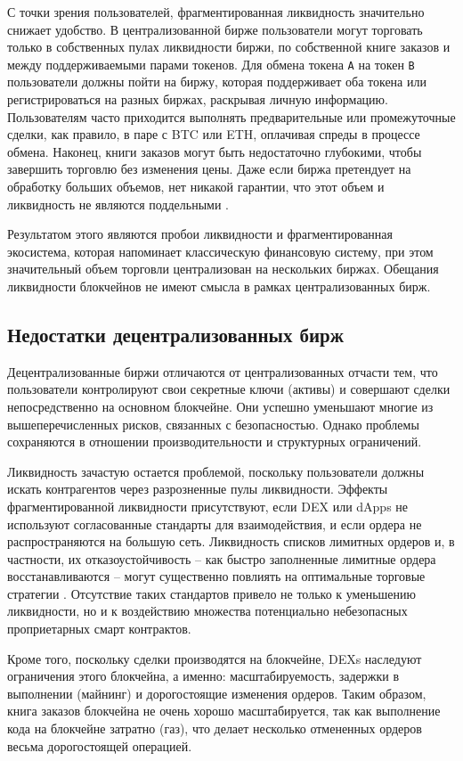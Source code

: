 \documentclass[utf8,nofonts]{article}
\begin{document}
\begin{multicols}{2}
	С точки зрения пользователей, фрагментированная ликвидность значительно снижает удобство. В централизованной бирже пользователи могут торговать только в собственных пулах ликвидности биржи, по собственной книге заказов и между поддерживаемыми парами токенов. Для обмена токена \verb|A| на токен \verb|B| пользователи должны пойти на биржу, которая поддерживает оба токена или регистрироваться на разных биржах, раскрывая личную информацию. Пользователям часто приходится выполнять предварительные или промежуточные сделки, как правило, в паре с BTC или ETH, оплачивая спреды в процессе обмена. Наконец, книги заказов могут быть недостаточно глубокими, чтобы завершить торговлю без изменения цены. Даже если биржа претендует на обработку больших объемов, нет никакой гарантии, что этот объем и ликвидность не являются поддельными \cite{fakevolume}.
	
	Результатом этого являются пробои ликвидности и фрагментированная экосистема, которая напоминает классическую финансовую систему, при этом значительный объем торговли централизован на нескольких биржах. Обещания ликвидности блокчейнов не имеют смысла в рамках централизованных бирж.
	
	\subsection{Недостатки децентрализованных бирж}
	Децентрализованные биржи отличаются от централизованных отчасти тем, что пользователи контролируют свои секретные ключи (активы) и совершают сделки непосредственно на основном блокчейне. Они успешно уменьшают многие из вышеперечисленных рисков, связанных с безопасностью. Однако проблемы сохраняются в отношении производительности и структурных ограничений. 
	
	Ликвидность зачастую остается проблемой, поскольку пользователи должны искать контрагентов через разрозненные пулы ликвидности. Эффекты фрагментированной ликвидности присутствуют, если DEX или dApps не используют согласованные стандарты для взаимодействия, и если ордера не распространяются на большую сеть. Ликвидность списков лимитных ордеров и, в частности, их отказоустойчивость -- как быстро заполненные лимитные ордера восстанавливаются -- могут существенно повлиять на оптимальные торговые стратегии \cite{limitorderliquidity}. Отсутствие таких стандартов привело не только к уменьшению ликвидности, но и к воздействию множества потенциально небезопасных проприетарных смарт контрактов.
	
	Кроме того, поскольку сделки производятся на блокчейне, DEXs наследуют ограничения этого блокчейна, а именно: масштабируемость, задержки в выполнении (майнинг) и дорогостоящие изменения ордеров. Таким образом, книга заказов блокчейна не очень хорошо масштабируется, так как выполнение кода на блокчейне затратно (газ), что делает несколько отмененных ордеров весьма дорогостоящей операцией. 
	

\end{multicols}
\end{document}
